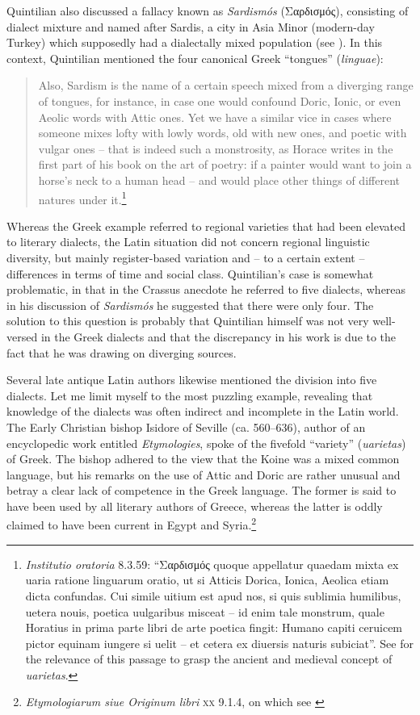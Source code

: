 Quintilian also discussed a fallacy known as \textit{Sardismós} (Σαρδισμός), consisting of dialect mixture and named after Sardis, a city in Asia Minor (modern-day Turkey) which supposedly had a dialectally mixed population (see \citealt{Gitner2019}). In this context, Quintilian mentioned the four canonical Greek “tongues” (\textit{linguae}):

\begin{quote}
Also, Sardism is the name of a certain speech mixed from a diverging range of tongues, for instance, in case one would confound Doric, Ionic, or even Aeolic words with Attic ones. Yet we have a similar vice in cases where someone mixes lofty with lowly words, old with new ones, and poetic with vulgar ones – that is indeed such a monstrosity, as Horace writes in the first part of his book on the art of poetry: if a painter would want to join a horse’s neck to a human head – and would place other things of different natures under it.\footnote{{ \textit{Institutio oratoria}} {8.3.59: “Σαρδισμός quoque appellatur quaedam mixta ex uaria ratione linguarum oratio, ut si Atticis Dorica, Ionica, Aeolica etiam dicta confundas. Cui simile uitium est apud nos, si quis sublimia humilibus, uetera nouis, poetica uulgaribus misceat – id enim tale monstrum, quale Horatius in prima parte libri de arte poetica fingit: Humano capiti ceruicem pictor equinam iungere si uelit – et cetera ex diuersis naturis subiciat”. See \citet[46]{Carruthers2009} for the relevance of this passage to grasp the ancient and medieval concept of} {\textit{uarietas}}.}
\end{quote}

Whereas the Greek example referred to regional varieties that had been elevated to literary dialects, the Latin situation did not concern regional linguistic diversity, but mainly register-based variation and – to a certain extent – differences in terms of time and social class. Quintilian’s case is somewhat problematic, in that in the Crassus anecdote he referred to five dialects, whereas in his discussion of \textit{Sardismós} he suggested that there were only four. The solution to this question is probably that Quintilian himself was not very well-versed in the Greek dialects and that the discrepancy in his work is due to the fact that he was drawing on diverging sources.

Several late antique Latin authors likewise mentioned the division into five dialects. Let me limit myself to the most puzzling example, revealing that knowledge of the dialects was often indirect and incomplete in the Latin world. The Early Christian bishop Isidore of Seville (ca. 560–636), author of an encyclopedic work entitled \textit{Etymologies}, spoke of the fivefold “variety” (\textit{uarietas}) of Greek. The bishop adhered to the view that the Koine was a mixed common language, but his remarks on the use of Attic and Doric are rather unusual and betray a clear lack of competence in the Greek language. The former is said to have been used by all literary authors of Greece, whereas the latter is oddly claimed to have been current in Egypt and Syria.\footnote{\textit{Etymologiarum siue Originum libri} \textsc{xx} 9.1.4, on which see \citet[227–229]{Denecker2017}}

